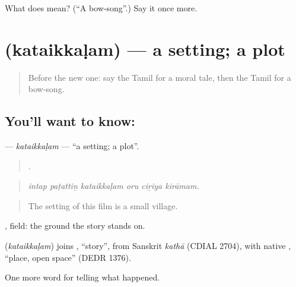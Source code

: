 \begin{tcolorbox}[breakable,colback=teal!4,colframe=teal!35!black,title={Before you move on}]
What does  mean? (\textquotedblleft{}A bow-song\textquotedblright{}.) Say it once more.
\end{tcolorbox}
\section[\texorpdfstring{\ta{கதைக்களம்} (kataikkaḷam)}{கதைக்களம் (kataikkaḷam)}]{ (kataikkaḷam) — a setting; a plot}

\label{lesson:TA-C345-kataikkalam}



\begin{quote}
Before the new one: say the Tamil for a moral tale, then the Tamil for a bow-song.
\end{quote}

\subsection*{You'll want to know: }
\textbf{} — \emph{kataikkaḷam} — \textquotedblleft{}a setting; a plot\textquotedblright{}.

\begin{quote}
     .
\end{quote}

\begin{quote}
\emph{intap paṭattiṉ kataikkaḷam oru ciṟiya kirāmam.}
\end{quote}

\begin{quote}
The setting of this film is a small village.
\end{quote}

, field: the ground the story stands on.

\begin{cousinweb}
\textbf{} (\emph{kataikkaḷam}) joins , \textquotedblleft{}story\textquotedblright{}, from Sanskrit \emph{kathā} (CDIAL 2704), with native , \textquotedblleft{}place, open space\textquotedblright{} (DEDR 1376).
\end{cousinweb}

\begin{grammarlens}[title={What you've built}]
One more word for telling what happened.
\end{grammarlens}

